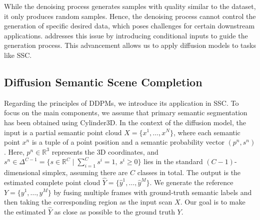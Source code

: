 \documentclass[conference]{IEEEtran}
\begin{document}
While the denoising process generates samples with quality similar to the dataset, it only produces random samples.
Hence, the denoising process cannot control the generation of specific desired data, which poses challenges for certain downstream applications.
\cite{yliao} addresses this issue by introducing conditional inputs to guide the generation process.
This advancement allows us to apply diffusion models to tasks like SSC.

\subsection{Diffusion Semantic Scene Completion}

Regarding the principles of DDPMs, we introduce its application in SSC.
To focus on the main components, we assume that primary semantic segmentation has been obtained using Cylinder3D.
In the context of the diffusion model, the input is a partial semantic point cloud $X = \{x^1, \ldots, x^N\}$, where each semantic point $x^n$ is a tuple of a point position and a semantic probability vector $(p^n, s^n)$.
Here, $p^n \in \mathbb{R}^3$ represents the 3D coordinates, and $s^n \in \Delta^{C-1} = \{s \in \mathbb{R}^C \mid \sum_{i=1}^C s^i = 1,\, s^i \geq 0\}$ lies in the standard $(C-1)$-dimensional simplex, assuming there are $C$ classes in total.
The output is the estimated complete point cloud $\hat{Y} = \{\hat{y}^1, \ldots, \hat{y}^M\}$.
We generate the reference $Y = \{y^1, \ldots, y^M\}$ by fusing multiple frames with ground-truth semantic labels and then taking the corresponding region as the input scan $X$.
Our goal is to make the estimated $\hat{Y}$ as close as possible to the ground truth $Y$.
\end{document}
